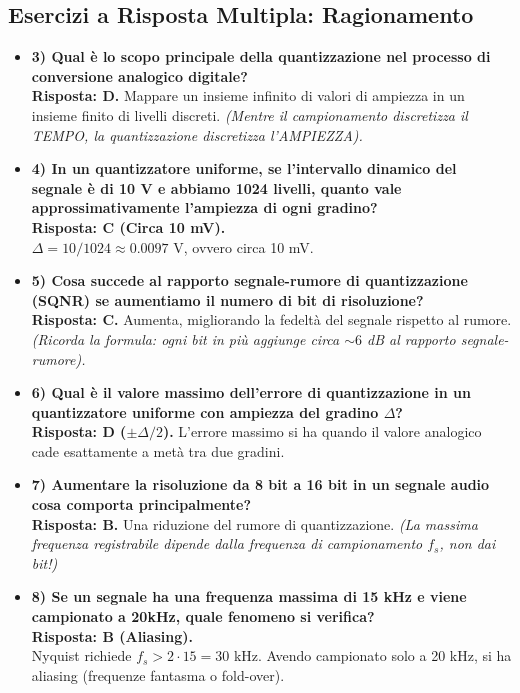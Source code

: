 \subsection{Esercizi a Risposta Multipla: Ragionamento}

\begin{itemize}
    \item \textbf{3) Qual è lo scopo principale della quantizzazione nel processo di conversione analogico digitale?} \\
    \textbf{Risposta: D.} Mappare un insieme infinito di valori di ampiezza in un insieme finito di livelli discreti. \textit{(Mentre il campionamento discretizza il TEMPO, la quantizzazione discretizza l'AMPIEZZA).}

    \item \textbf{4) In un quantizzatore uniforme, se l'intervallo dinamico del segnale è di 10 V e abbiamo
    1024 livelli, quanto vale approssimativamente l'ampiezza di ogni gradino?} \\
    \textbf{Risposta: C (Circa 10 mV).} \\
    $\Delta = 10 / 1024 \approx 0.0097$ V, ovvero circa 10 mV.

    \item \textbf{5) Cosa succede al rapporto segnale-rumore di quantizzazione (SQNR) se aumentiamo il
    numero di bit di risoluzione?} \\
    \textbf{Risposta: C.} Aumenta, migliorando la fedeltà del segnale rispetto al rumore. \textit{(Ricorda la formula: ogni bit in più aggiunge circa $\sim 6$ dB al rapporto segnale-rumore).}

    \item \textbf{6) Qual è il valore massimo dell'errore di quantizzazione in un quantizzatore uniforme con
    ampiezza del gradino $\Delta$?} \\
    \textbf{Risposta: D ($\pm \Delta / 2$).} L'errore massimo si ha quando il valore analogico cade esattamente a metà tra due gradini.

    \item \textbf{7) Aumentare la risoluzione da 8 bit a 16 bit in un segnale audio cosa comporta principalmente?} \\
    \textbf{Risposta: B.} Una riduzione del rumore di quantizzazione. \textit{(La massima frequenza registrabile dipende dalla frequenza di campionamento $f_s$, non dai bit!)}

    \item \textbf{8) Se un segnale ha una frequenza massima di 15 kHz e viene campionato a 20kHz, quale
    fenomeno si verifica?} \\
    \textbf{Risposta: B (Aliasing).} \\
    Nyquist richiede $f_s > 2 \cdot 15 = 30$ kHz. Avendo campionato solo a 20 kHz, si ha aliasing (frequenze fantasma o fold-over).


\end{itemize}
